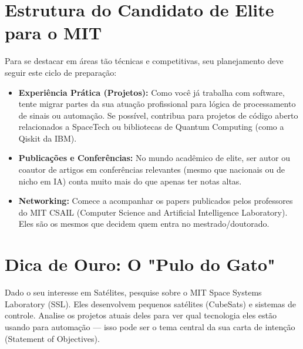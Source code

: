 \documentclass{article}
\begin{document}
\section*{Estrutura do Candidato de Elite para o MIT}
Para se destacar em áreas tão técnicas e competitivas, seu planejamento deve seguir este ciclo de preparação:
\begin{itemize}
    \item \textbf{Experiência Prática (Projetos):} Como você já trabalha com software, tente migrar partes da sua atuação profissional para lógica de processamento de sinais ou automação. Se possível, contribua para projetos de código aberto relacionados a SpaceTech ou bibliotecas de Quantum Computing (como a Qiskit da IBM).
    \item \textbf{Publicações e Conferências:} No mundo acadêmico de elite, ser autor ou coautor de artigos em conferências relevantes (mesmo que nacionais ou de nicho em IA) conta muito mais do que apenas ter notas altas.
    \item \textbf{Networking:} Comece a acompanhar os papers publicados pelos professores do MIT CSAIL (Computer Science and Artificial Intelligence Laboratory). Eles são os mesmos que decidem quem entra no mestrado/doutorado.
\end{itemize}

\section*{Dica de Ouro: O "Pulo do Gato"}
Dado o seu interesse em Satélites, pesquise sobre o MIT Space Systems Laboratory (SSL). Eles desenvolvem pequenos satélites (CubeSats) e sistemas de controle. Analise os projetos atuais deles para ver qual tecnologia eles estão usando para automação — isso pode ser o tema central da sua carta de intenção (Statement of Objectives).
\end{document}
